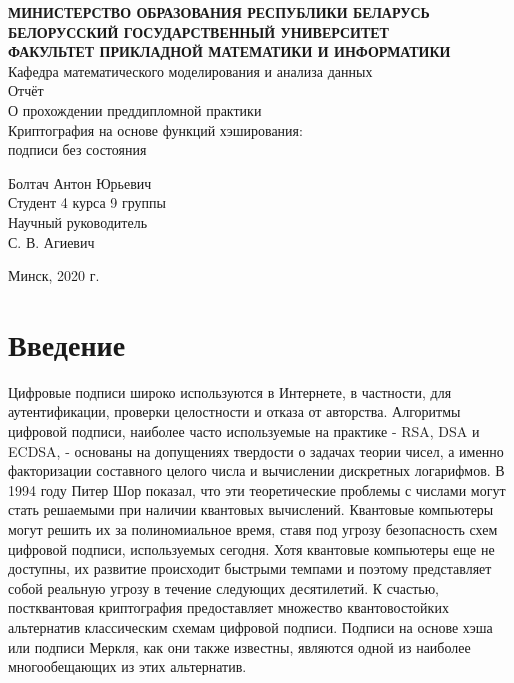 \documentclass[a4paper, 14pt]{extarticle}
\begin{document}

\begin{center}
    \normalsize{\textbf{МИНИСТЕРСТВО ОБРАЗОВАНИЯ РЕСПУБЛИКИ БЕЛАРУСЬ}}\\
    \hfill \break
    \normalsize{\textbf{БЕЛОРУССКИЙ ГОСУДАРСТВЕННЫЙ УНИВЕРСИТЕТ}}\\
    \hfill \break
    \small{\textbf{ФАКУЛЬТЕТ ПРИКЛАДНОЙ МАТЕМАТИКИ И ИНФОРМАТИКИ}}\\
    \hfill \break
    \large{Кафедра математического моделирования и анализа данных}\\
    \vspace{40mm}
    \normalsize{Отчёт}\\
    \hfill \break
    \normalsize{О прохождении преддипломной практики}\\
    \hfill \break
    \normalsize{Криптография на основе функций хэширования:\\ подписи без состояния}\\
    \hfill \break
\end{center}

\begin{flushright}
    \vspace{20mm}
    Болтач Антон Юрьевич\\
    Студент 4 курса 9 группы\\
    Научный руководитель\\
    С. В. Агиевич\\
\end{flushright}

\vfill
\begin{center}
    Минск, 2020 г.
\end{center}
\thispagestyle{empty} %
    

\newpage

\tableofcontents
\newpage

\section{Введение}
Цифровые подписи широко используются в Интернете, в частности, для аутентификации, проверки целостности и отказа от авторства. Алгоритмы цифровой подписи, наиболее часто используемые на практике - RSA, DSA и ECDSA, - основаны на допущениях твердости о задачах теории чисел, а именно факторизации составного целого числа и вычислении дискретных логарифмов. В 1994 году Питер Шор показал, что эти теоретические проблемы с числами могут стать решаемыми при наличии квантовых вычислений. Квантовые компьютеры могут решить их за полиномиальное время, ставя под угрозу безопасность схем цифровой подписи, используемых сегодня. Хотя квантовые компьютеры еще не доступны, их развитие происходит быстрыми темпами и поэтому представляет собой реальную угрозу в течение следующих десятилетий. К счастью, постквантовая криптография предоставляет множество квантовостойких альтернатив классическим схемам цифровой подписи. Подписи на основе хэша или подписи Меркля, как они также известны, являются одной из наиболее многообещающих из этих альтернатив.
\end{document}

